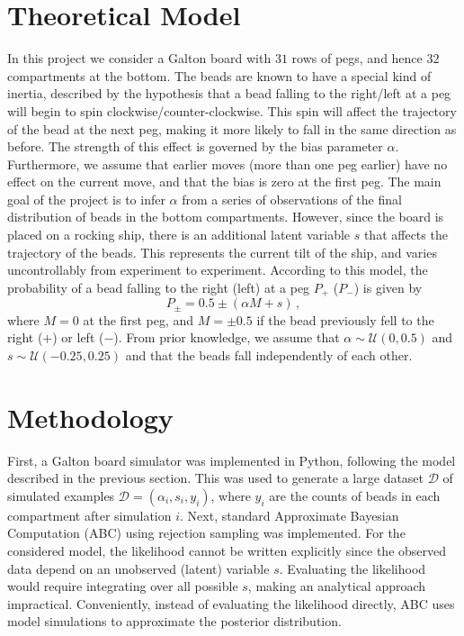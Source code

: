 \documentclass[a4paper, 12pt]{article}
\begin{document}
\section{Theoretical Model}
In this project we consider a Galton board with $31$ rows of pegs, and hence $32$ compartments at the bottom. The beads are known to have a special kind of inertia, described by the hypothesis that a bead falling to the right/left at a peg will begin to spin clockwise/counter-clockwise. This spin will affect the trajectory of the bead at the next peg, making it more likely to fall in the same direction as before. The strength of this effect is governed by the bias parameter $\alpha$. Furthermore, we assume that earlier moves (more than one peg earlier) have no effect on the current move, and that the bias is zero at the first peg. The main goal of the project is to infer $\alpha$ from a series of observations of the final distribution of beads in the bottom compartments. However, since the board is placed on a rocking ship, there is an additional latent variable $s$ that affects the trajectory of the beads. This represents the current tilt of the ship, and varies uncontrollably from experiment to experiment. According to this model, the probability of a bead falling to the right (left) at a peg $P_+$ ($P_-$) is given by
\begin{equation}
    P_\pm = 0.5 \pm (\alpha M + s)\,,
\end{equation}
where $M = 0$ at the first peg, and $M = \pm 0.5$ if the bead previously fell to the right ($+$) or left ($-$). From prior knowledge, we assume that $\alpha \sim \mathcal{U}(0, 0.5)$ and $s \sim \mathcal{U}(-0.25, 0.25)$ and that the beads fall independently of each other.

\section{Methodology}
First, a Galton board simulator was implemented in Python, following the model described in the previous section. This was used to generate a large dataset $\mathcal{D}$ of simulated examples $\mathcal{D} = (\alpha_i, s_i, y_i)$, where $y_i$ are the counts of beads in each compartment after simulation $i$. Next, standard Approximate Bayesian Computation (ABC) using rejection sampling was implemented. For the considered model, the likelihood cannot be written explicitly since the observed data depend on an unobserved (latent) variable $s$. Evaluating the likelihood would require integrating over all possible $s$, making an analytical approach impractical. Conveniently, instead of evaluating the likelihood directly, ABC uses model simulations to approximate the posterior distribution. 
\end{document}
